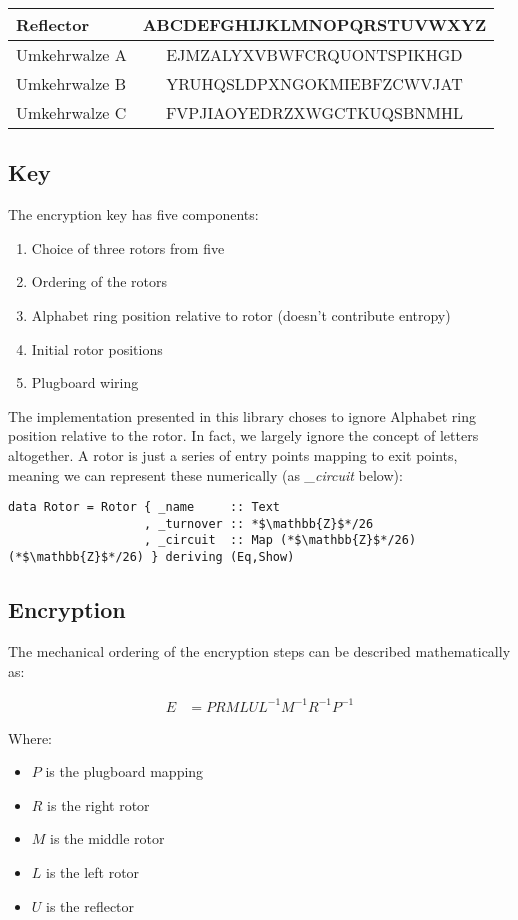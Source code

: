 \documentclass{article}
\begin{document}
\begin{center}
  \begin{tabular}{l | c}
    Reflector & ABCDEFGHIJKLMNOPQRSTUVWXYZ\\
    \hline
    Umkehrwalze A & EJMZALYXVBWFCRQUONTSPIKHGD\\
    Umkehrwalze B & YRUHQSLDPXNGOKMIEBFZCWVJAT\\
    Umkehrwalze C & FVPJIAOYEDRZXWGCTKUQSBNMHL
  \end{tabular}
\end{center}

\subsection{Key}
The encryption key has five components:
\begin{enumerate}
\item Choice of three rotors from five
\item Ordering of the rotors
\item Alphabet ring position relative to rotor (doesn't contribute entropy)
\item Initial rotor positions
\item Plugboard wiring
\end{enumerate}
The implementation presented in this library choses to ignore Alphabet ring
position relative to the rotor. In fact, we largely ignore the concept of
letters altogether. A rotor is just a series of entry points mapping
to exit points, meaning we can represent these numerically
(as \emph{\_circuit} below):

\begin{lstlisting}
data Rotor = Rotor { _name     :: Text
                   , _turnover :: *$\mathbb{Z}$*/26
                   , _circuit  :: Map (*$\mathbb{Z}$*/26) (*$\mathbb{Z}$*/26) } deriving (Eq,Show)  
\end{lstlisting}

\subsection{Encryption}
The mechanical ordering of the encryption steps can be described
mathematically as:

\begin{align*}
  E &= PRMLUL^{-1}M^{-1}R^{-1}P^{-1}
\end{align*}

Where:
\begin{itemize}
\item $P$ is the plugboard mapping
\item $R$ is the right rotor
\item $M$ is the middle rotor
\item $L$ is the left rotor
\item $U$ is the reflector
\end{itemize}
\end{document}
